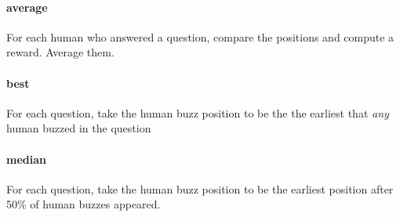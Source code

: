 \begin{frame}[t]
 { \paragraph{average} For each human who answered a question, compare the positions and compute a reward.  Average them.}
 { \paragraph{best} For each question, take the human buzz position to be the the
  earliest that \emph{any} human buzzed in the question}
 { \paragraph{median} For each question, take the human buzz position to be the
  earliest position after 50\% of human buzzes appeared.}
\end{frame}


